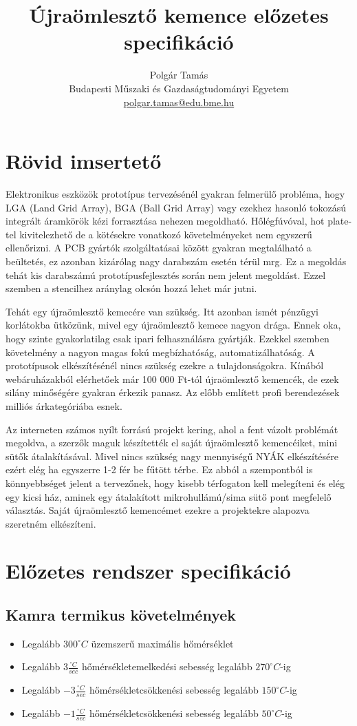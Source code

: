 \documentclass[11pt]{article} %
\title{Újraömlesztő kemence előzetes specifikáció}
\author{Polgár Tamás \\ Budapesti Műszaki és Gazdaságtudományi Egyetem \\ \href{mailto:polgar.tamas@edu.bme.hu}{polgar.tamas@edu.bme.hu} }
\begin{document}
\maketitle

\section{Rövid imsertető}
Elektronikus eszközök prototípus tervezésénél gyakran felmerülő probléma, hogy LGA (Land Grid Array), BGA (Ball Grid Array) vagy ezekhez hasonló tokozású integrált áramkörök kézi forrasztása nehezen megoldható. Hőlégfúvóval, hot plate-tel kivitelezhető de a kötésekre vonatkozó követelményeket nem egyszerű ellenőrizni. A PCB gyártók szolgáltatásai között gyakran megtalálható a beültetés, ez azonban kizárólag nagy darabszám esetén térül mrg. Ez a megoldás tehát kis darabszámú prototípusfejlesztés során nem jelent megoldást. Ezzel szemben a stencilhez aránylag olcsón hozzá lehet már jutni.

Tehát egy újraömlesztő kemecére van szükség. Itt azonban ismét pénzügyi korlátokba ütközünk, mivel egy újraömlesztő kemece nagyon drága. Ennek oka, hogy szinte gyakorlatilag csak ipari felhasználásra gyártják. Ezekkel szemben követelmény a nagyon magas fokú megbízhatóság, automatizálhatóság. A prototípusok elkészítésénél nincs szükség ezekre a tulajdonságokra. Kínából webáruházakból elérhetőek már 100 000 Ft-tól újraömlesztő kemencék, de ezek silány minőségére gyakran érkezik panasz. Az előbb említett profi berendezések milliós árkategóriába esnek.

Az interneten számos nyílt forrású projekt kering, ahol a fent vázolt problémát megoldva, a szerzők maguk készítették el saját újraömlesztő kemencéiket, mini sütők átalakításával. Mivel nincs szükség nagy mennyiségű NYÁK elkészítésére ezért elég ha egyszerre 1-2 fér be fűtött térbe. Ez abból a szempontból is könnyebbséget jelent a tervezőnek, hogy kisebb térfogaton kell melegíteni és elég egy kicsi ház, aminek egy átalakított mikrohullámú/sima sütő pont megfelelő választás. Saját újraömlesztő kemencémet ezekre a projektekre alapozva szeretném elkészíteni.

\newpage

\section{Előzetes rendszer specifikáció}
\subsection{Kamra termikus követelmények}
\begin{itemize}
\item Legalább $300 ^{\circ}C$ üzemszerű maximális hőmérséklet
\item Legalább $3 \frac{^{\circ}C}{sec}$  hőmérsékletemelkedési sebesség legalább $270 ^{\circ}C$-ig
\item Legalább $-3 \frac{^{\circ}C}{sec}$  hőmérsékletcsökkenési sebesség legalább $150 ^{\circ}C$-ig
\item Legalább $-1 \frac{^{\circ}C}{sec}$  hőmérsékletcsökkenési sebesség legalább $50 ^{\circ}C$-ig
\end{itemize}
\end{document}
